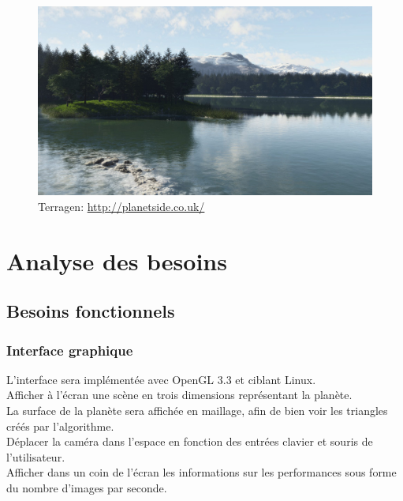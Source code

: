 \documentclass[12pt]{report}
\begin{document}
\begin{center}
\begin{figure}[!h]
  \includegraphics[scale=0.2]{img/Lake.jpg}
  \caption{Terragen: \protect\url{http://planetside.co.uk/}}
  \label{fig:Terragen}
\end{figure}
\end{center}

\newpage

\chapter*{Analyse des besoins}
\setcounter{chapter}{3}


\section{Besoins fonctionnels}

\subsection{Interface graphique}

L'interface sera implémentée avec OpenGL 3.3 et ciblant Linux.\\
Afficher à l'écran une scène en trois dimensions représentant la planète.\\
La surface de la planète sera affichée en maillage, afin de bien voir
les triangles créés par l'algorithme.\\
Déplacer la caméra dans l'espace en fonction des entrées clavier et
souris de l'utilisateur.\\
Afficher dans un coin de l'écran les informations sur les performances
sous forme du nombre d'images par seconde.\\
\end{document}
